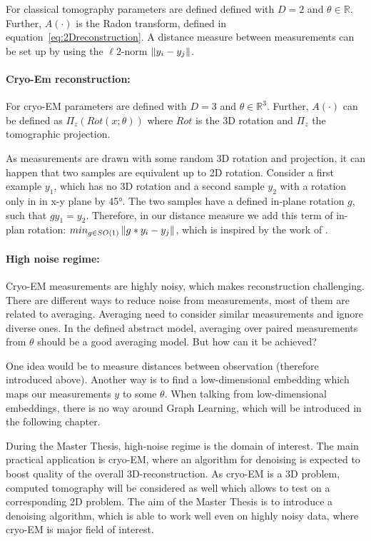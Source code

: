 For classical tomography parameters are defined defined with $D=2$ and $\theta \in \mathbb{R}$.
Further, $A(\cdot)$ is the Radon transform, defined in equation~\ref{eq:2Dreconstruction}.
A distance measure between measurements can be set up by using the $\ell2$-norm $\left\lVert y_i - y_j\right\rVert$.

\paragraph{Cryo-Em reconstruction:}
For cryo-EM parameters are defined with $D=3$ and $\theta \in \mathbb{R}^3$.
Further, $A(\cdot)$ can be defined as $\Pi_z \left( Rot(x; \theta) \right)$ 
where $Rot$ is the 3D rotation and $\Pi_z$ the tomographic projection.

As measurements are drawn with some random 3D rotation and projection, 
it can happen that two samples are equivalent up to 2D rotation. 
Consider a first example $y_1$, which has no 3D rotation and 
a second sample $y_2$ with a rotation only in in x-y plane by 45°.
The two samples have a defined in-plane rotation $g$, such that $g y_1 = y_2$.
Therefore, in our distance measure we add this term of in-plan rotation: $min_{g \in SO(1)}\left\lVert g * y_i - y_j\right\rVert$, 
which is inspired by the work of \cite{multiDiffusionMaps}. 


\paragraph{High noise regime:}
Cryo-EM measurements are highly noisy, which makes reconstruction challenging. 
There are different ways to reduce noise from measurements, most of them are related to averaging. 
Averaging need to consider similar measurements and ignore diverse ones. 
In the defined abstract model, averaging over paired measurements from $\theta$ should be a good averaging model.
But how can it be achieved? 

One idea would be to measure distances between observation (therefore introduced above).
Another way is to find a low-dimensional embedding which maps our measurements $y$ to some $\theta$.
When talking from low-dimensional embeddings, there is no way around Graph Learning, which will be introduced
in the following chapter.

\begin{tcolorbox}[colback=red!5!white,colframe=red!75!black]
    During the Master Thesis, high-noise regime is the domain of interest.
    The main practical application is cryo-EM, where an algorithm for denoising is expected to boost
    quality of the overall 3D-reconstruction. As cryo-EM is a 3D problem, computed tomography will
    be considered as well which allows to test on a corresponding 2D problem.
    The aim of the Master Thesis is to introduce a denoising algorithm, which is able to work well even 
    on highly noisy data, where cryo-EM is major field of interest.
\end{tcolorbox}
